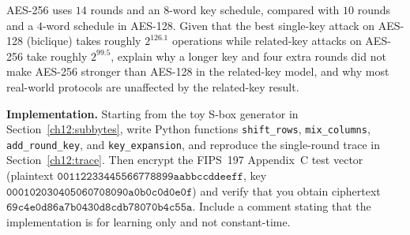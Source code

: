 \begin{exercise}
AES-256 uses $14$ rounds and an $8$-word key schedule, compared with $10$ rounds
and a $4$-word schedule in AES-128. Given that the best single-key attack on
AES-128 (biclique) takes roughly $2^{126.1}$ operations while related-key attacks
on AES-256 take roughly $2^{99.5}$, explain why a longer key and four extra rounds
did not make AES-256 stronger than AES-128 in the related-key model, and why most
real-world protocols are unaffected by the related-key result.
\end{exercise}

\begin{exercise}
\textbf{Implementation.} Starting from the toy S-box generator in
Section~\ref{ch12:subbytes}, write Python functions \texttt{shift\_rows},
\texttt{mix\_columns}, \texttt{add\_round\_key}, and \texttt{key\_expansion}, and
reproduce the single-round trace in Section~\ref{ch12:trace}. Then encrypt the
FIPS~197 Appendix~C test vector (plaintext
$\mathtt{00112233445566778899aabbccddeeff}$, key
$\mathtt{000102030405060708090a0b0c0d0e0f}$) and verify that you obtain ciphertext
$\mathtt{69c4e0d86a7b0430d8cdb78070b4c55a}$. Include a comment stating that the
implementation is for learning only and not constant-time.
\end{exercise}
